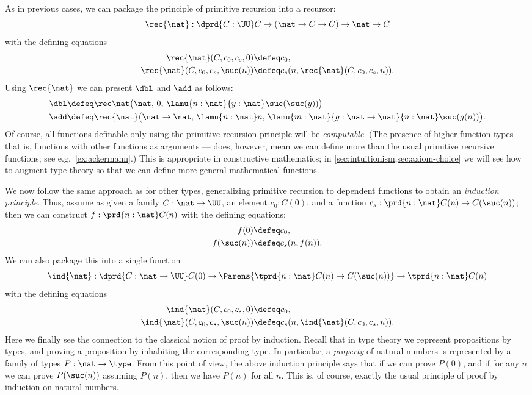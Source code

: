 As in previous cases, we can package the principle of primitive recursion into a recursor:
\[\rec{\nat}  : \dprd{C:\UU} C \to (\nat \to C \to C) \to \nat \to C \]
with the defining equations
%
\begin{align*}
\rec{\nat}(C,c_0,c_s,0)  &\defeq c_0, \\
\rec{\nat}(C,c_0,c_s,\suc(n)) &\defeq c_s(n,\rec{\nat}(C,c_0,c_s,n)).
\end{align*}
Using $\rec{\nat}$ we can present $\dbl$ and $\add$ as follows:
\begin{align}
\dbl &\defeq \rec\nat\big(\nat,\, 0,\, \lamu{n:\nat}{y:\nat} \suc(\suc(y))\big) \label{eq:dbl-as-rec}\\
\add &\defeq \rec{\nat}\big(\nat \to \nat,\, \lamu{n:\nat} n,\, \lamu{m:\nat}{g:\nat \to \nat}{n :\nat} \suc(g(n))\big).
\end{align}
Of course, all functions definable only using the primitive recursion principle will be \emph{computable}.
(The presence of higher function types --- that is, functions with other functions as arguments --- does, however, mean we can define more than the usual primitive recursive functions; see e.g.~\cref{ex:ackermann}.)
This is appropriate in constructive mathematics;
%
in \cref{sec:intuitionism,sec:axiom-choice} we will see how to augment type theory so that we can define more general mathematical functions.

We now follow the same approach as for other types, generalizing primitive recursion to dependent functions to obtain an \emph{induction principle}.
Thus, assume as given a family $C : \nat \to \UU$, an element $c_0 : C(0)$, and a function $c_s : \prd{n:\nat} C(n) \to C(\suc(n))$; then we can construct $f : \prd{n:\nat} C(n)$ with the defining equations:
\begin{align*}
  f(0) &\defeq c_0, \\
  f(\suc(n)) &\defeq c_s(n,f(n)).
\end{align*}
We can also package this into a single function
%
\[\ind{\nat}  : \dprd{C:\nat\to \UU} C(0) \to \Parens{\tprd{n : \nat} C(n) \to C(\suc(n))} \to \tprd{n : \nat} C(n) \]
with the defining equations
\begin{align*}
\ind{\nat}(C,c_0,c_s,0)  &\defeq c_0, \\
\ind{\nat}(C,c_0,c_s,\suc(n)) &\defeq c_s(n,\ind{\nat}(C,c_0,c_s,n)).
\end{align*}
Here we finally see the connection to the classical notion of proof by induction.
Recall that in type theory we represent propositions by types, and proving a proposition by inhabiting the corresponding type.
In particular, a \emph{property} of natural numbers is represented by a family of types $P:\nat\to\type$.
From this point of view, the above induction principle says that if we can prove $P(0)$, and if for any $n$ we can prove $P(\suc(n))$ assuming $P(n)$, then we have $P(n)$ for all $n$.
This is, of course, exactly the usual principle of proof by induction on natural numbers.

